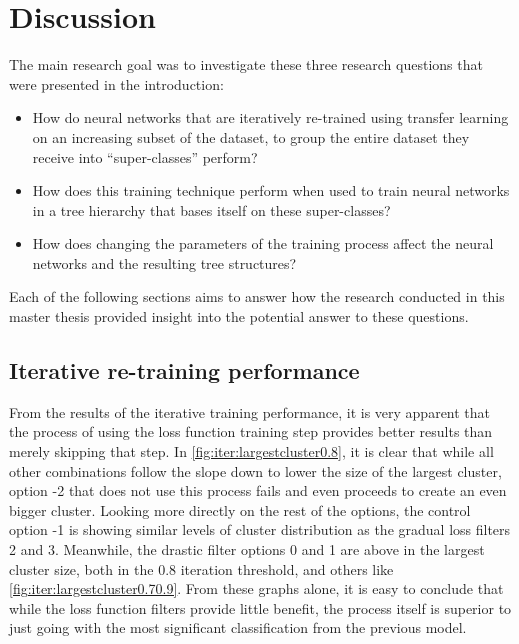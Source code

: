 \chapter{Discussion}


The main research goal was to investigate these three research questions that were presented in the introduction:

\begin{itemize}
    \item How do neural networks that are iteratively re-trained using transfer learning on an increasing subset of the dataset, to group the entire dataset they receive into “super-classes” perform? 
    \item How does this training technique perform when used to train neural networks in a tree hierarchy that bases itself on these super-classes?
    \item How does changing the parameters of the training process affect the neural networks and the resulting tree structures?
\end{itemize}{}

Each of the following sections aims to answer how the research conducted in this master thesis provided insight into the potential answer to these questions.


\section{Iterative re-training performance}
From the results of the iterative training performance, it is very apparent that the process of using the loss function training step provides better results than merely skipping that step.
In \cref{fig:iter:largestcluster0.8}, it is clear that while all other combinations follow the slope down to lower the size of the largest cluster, option -2 that does not use this process fails and even proceeds to create an even bigger cluster.
Looking more directly on the rest of the options, the control option -1 is showing similar levels of cluster distribution as the gradual loss filters 2 and 3.
Meanwhile, the drastic filter options 0 and 1 are above in the largest cluster size, both in the 0.8 iteration threshold, and others like \cref{fig:iter:largestcluster0.70.9}.
From these graphs alone, it is easy to conclude that while the loss function filters provide little benefit, the process itself is superior to just going with the most significant classification from the previous model.

